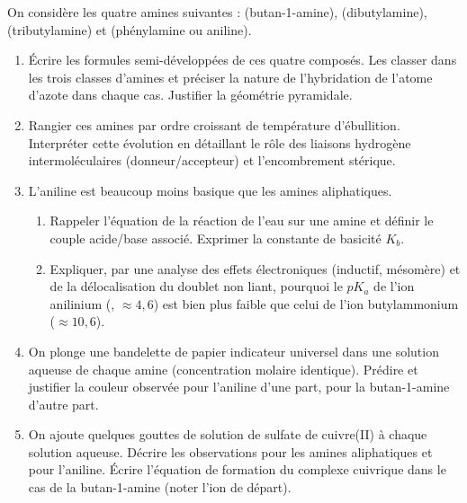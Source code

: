 \documentclass[11pt]{article}
\begin{document}
\begin{exercice}
On considère les quatre amines suivantes :  (butan-1-amine),  (dibutylamine),  (tributylamine) et  (phénylamine ou aniline).
\begin{enumerate}
    \item Écrire les formules semi-développées de ces quatre composés. Les classer dans les trois classes d'amines et préciser la nature de l'hybridation de l'atome d'azote dans chaque cas. Justifier la géométrie pyramidale.
    \item Rangier ces amines par ordre croissant de température d'ébullition. Interpréter cette évolution en détaillant le rôle des liaisons hydrogène intermoléculaires (donneur/accepteur) et l'encombrement stérique.
    \item L'aniline est beaucoup moins basique que les amines aliphatiques. 
    \begin{enumerate}
        \item Rappeler l'équation de la réaction de l'eau sur une amine  et définir le couple acide/base associé. Exprimer la constante de basicité $K_b$.
        \item Expliquer, par une analyse des effets électroniques (inductif, mésomère) et de la délocalisation du doublet non liant, pourquoi le $pK_a$ de l'ion anilinium (, $\approx 4,6$) est bien plus faible que celui de l'ion butylammonium ($\approx 10,6$).
    \end{enumerate}
    \item On plonge une bandelette de papier indicateur universel dans une solution aqueuse de chaque amine (concentration molaire identique). Prédire et justifier la couleur observée pour l'aniline d'une part, pour la butan-1-amine d'autre part.
    \item On ajoute quelques gouttes de solution de sulfate de cuivre(II)  à chaque solution aqueuse. Décrire les observations pour les amines aliphatiques et pour l'aniline. Écrire l'équation de formation du complexe cuivrique dans le cas de la butan-1-amine (noter  l'ion de départ).
\end{enumerate}
\end{exercice}
\end{document}
